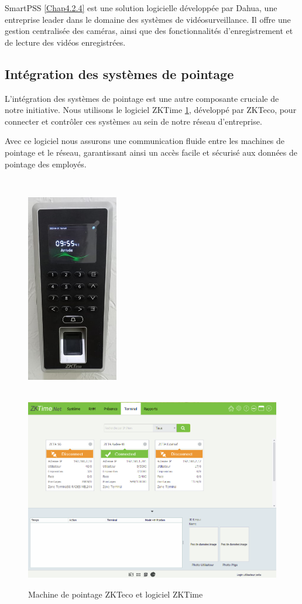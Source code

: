 SmartPSS \ref{Chap4.2.4} est une solution logicielle développée par Dahua, une entreprise leader dans le domaine des systèmes de vidéosurveillance. Il offre une gestion centralisée des caméras, ainsi que des fonctionnalités d'enregistrement et de lecture des vidéos enregistrées. 


\subsection{Intégration des systèmes de pointage}

L'intégration des systèmes de pointage est une autre composante cruciale de notre initiative. Nous utilisons le logiciel ZKTime \ref{Chap4.2.5}, développé par ZKTeco, pour connecter et contrôler ces systèmes au sein de notre réseau d'entreprise. 

Avec ce logiciel nous assurons une communication fluide entre les machines de pointage et le réseau, garantissant ainsi un accès facile et sécurisé aux données de pointage des employés.

\begin{figure}[H]
\centering
\includegraphics[height=10cm,width=4cm]{Images/BRades-Pointage.jpg}\includegraphics[width=12cm]{Images/ZKTime.png}
\caption{Machine de pointage ZKTeco et logiciel ZKTime}
\label{Chap4.2.5}
\end{figure}
\smallskip

